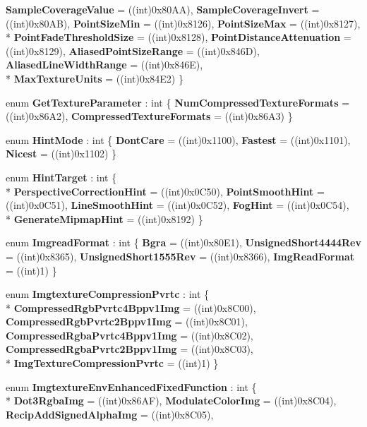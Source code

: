 \begin{DoxyCompactItemize}
{\bfseries Sample\-Coverage\-Value} = ((int)0x80\-A\-A), 
{\bfseries Sample\-Coverage\-Invert} = ((int)0x80\-A\-B), 
{\bfseries Point\-Size\-Min} = ((int)0x8126), 
{\bfseries Point\-Size\-Max} = ((int)0x8127), 
\\*
{\bfseries Point\-Fade\-Threshold\-Size} = ((int)0x8128), 
{\bfseries Point\-Distance\-Attenuation} = ((int)0x8129), 
{\bfseries Aliased\-Point\-Size\-Range} = ((int)0x846\-D), 
{\bfseries Aliased\-Line\-Width\-Range} = ((int)0x846\-E), 
\\*
{\bfseries Max\-Texture\-Units} = ((int)0x84\-E2)
 \}
\item 
enum {\bfseries Get\-Texture\-Parameter} \-: int \{ {\bfseries Num\-Compressed\-Texture\-Formats} = ((int)0x86\-A2), 
{\bfseries Compressed\-Texture\-Formats} = ((int)0x86\-A3)
 \}
\item 
enum {\bfseries Hint\-Mode} \-: int \{ {\bfseries Dont\-Care} = ((int)0x1100), 
{\bfseries Fastest} = ((int)0x1101), 
{\bfseries Nicest} = ((int)0x1102)
 \}
\item 
enum {\bfseries Hint\-Target} \-: int \{ \\*
{\bfseries Perspective\-Correction\-Hint} = ((int)0x0\-C50), 
{\bfseries Point\-Smooth\-Hint} = ((int)0x0\-C51), 
{\bfseries Line\-Smooth\-Hint} = ((int)0x0\-C52), 
{\bfseries Fog\-Hint} = ((int)0x0\-C54), 
\\*
{\bfseries Generate\-Mipmap\-Hint} = ((int)0x8192)
 \}
\item 
enum {\bfseries Imgread\-Format} \-: int \{ {\bfseries Bgra} = ((int)0x80\-E1), 
{\bfseries Unsigned\-Short4444\-Rev} = ((int)0x8365), 
{\bfseries Unsigned\-Short1555\-Rev} = ((int)0x8366), 
{\bfseries Img\-Read\-Format} = ((int)1)
 \}
\item 
enum {\bfseries Imgtexture\-Compression\-Pvrtc} \-: int \{ \\*
{\bfseries Compressed\-Rgb\-Pvrtc4\-Bppv1\-Img} = ((int)0x8\-C00), 
{\bfseries Compressed\-Rgb\-Pvrtc2\-Bppv1\-Img} = ((int)0x8\-C01), 
{\bfseries Compressed\-Rgba\-Pvrtc4\-Bppv1\-Img} = ((int)0x8\-C02), 
{\bfseries Compressed\-Rgba\-Pvrtc2\-Bppv1\-Img} = ((int)0x8\-C03), 
\\*
{\bfseries Img\-Texture\-Compression\-Pvrtc} = ((int)1)
 \}
\item 
enum {\bfseries Imgtexture\-Env\-Enhanced\-Fixed\-Function} \-: int \{ \\*
{\bfseries Dot3\-Rgba\-Img} = ((int)0x86\-A\-F), 
{\bfseries Modulate\-Color\-Img} = ((int)0x8\-C04), 
{\bfseries Recip\-Add\-Signed\-Alpha\-Img} = ((int)0x8\-C05), 

\end{DoxyCompactItemize}
